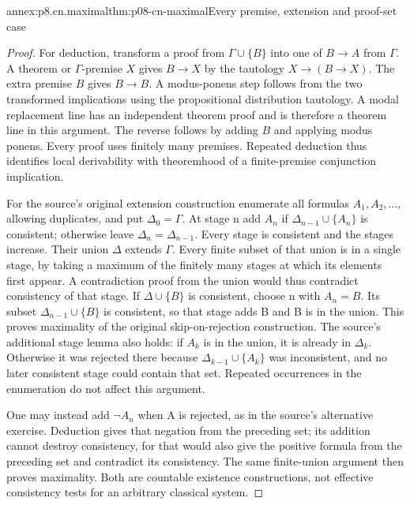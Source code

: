 \begin{annexitem}{annex:p8.cn.maximal}{thm:p08-cn-maximal}{Every premise, extension and proof-set case}
\begin{proof}
For deduction, transform a proof from \(\Gamma\cup\{B\}\)
into one of \(B\to A\) from \(\Gamma\). A theorem or
\(\Gamma\)-premise \(X\) gives \(B\to X\) by the
tautology \(X\to(B\to X)\). The extra premise \(B\)
gives \(B\to B\). A modus-ponens step follows from the
two transformed implications using the propositional distribution
tautology. A modal replacement line has an independent theorem
proof and is therefore a theorem line in this argument. The
reverse follows by adding \(B\) and applying modus ponens.
Every proof uses finitely many premises. Repeated deduction thus
identifies local derivability with theoremhood of a finite-premise
conjunction implication.

For the source's original extension construction enumerate all
formulas \(A_1,A_2,\ldots\), allowing duplicates, and put
\(\Delta_0=\Gamma\). At stage n add \(A_n\) if
\(\Delta_{n-1}\cup\{A_n\}\) is consistent; otherwise
leave \(\Delta_n=\Delta_{n-1}\). Every stage is consistent
and the stages increase. Their union \(\Delta\) extends
\(\Gamma\). Every finite subset of that union is in a single
stage, by taking a maximum of the finitely many stages at which
its elements first appear. A contradiction proof from the union
would thus contradict consistency of that stage.
If \(\Delta\cup\{B\}\) is consistent, choose n with
\(A_n=B\). Its subset \(\Delta_{n-1}\cup\{B\}\)
is consistent, so that stage adds B and B is in the union.
This proves maximality of the original skip-on-rejection construction.
The source's additional stage lemma also holds: if \(A_k\)
is in the union, it is already in \(\Delta_k\). Otherwise
it was rejected there because \(\Delta_{k-1}\cup\{A_k\}\)
was inconsistent, and no later consistent stage could contain
that set. Repeated occurrences in the enumeration do not affect
this argument.

One may instead add \(\neg A_n\) when A is rejected, as in
the source's alternative exercise. Deduction gives that negation
from the preceding set; its addition cannot destroy consistency,
for that would also give the positive formula from the preceding
set and contradict its consistency. The same finite-union argument
then proves maximality. Both are countable existence constructions,
not effective consistency tests for an arbitrary classical system.


\end{proof}
\end{annexitem}
